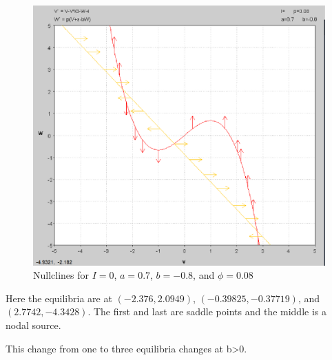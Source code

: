 \documentclass[../Orator]{subfiles}
\begin{document}
\begin{figure}[h]
    \centering
    \includegraphics[width=400pt]{Pictures/Alex/Nullclines - negative.PNG}
    \caption{Nullclines for \(I=0\), \(a=0.7\), \(b=-0.8\), and \(\phi=0.08\)}
    \label{fig:nullclines-negative}
\end{figure}

Here the equilibria are at \((-2.376, 2.0949)\), \((-0.39825, -0.37719)\), and \((2.7742, -4.3428)\). The first and last are saddle points and the middle is a nodal source.

This change from one to three equilibria changes at b>0. 

\end{document}
